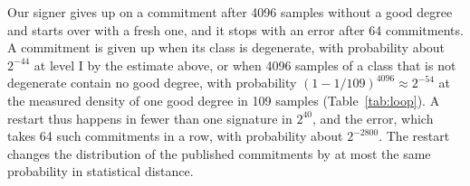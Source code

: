 \documentclass[version=preprint]{iacrcc}
\begin{document}
    Our signer gives up on a commitment after 4096 samples without a good
    degree and starts over with a fresh one, and it stops with an error after
    64 commitments. A commitment is given up when its class is degenerate,
    with probability about $2^{-44}$ at level I by the estimate above, or when
    4096 samples of a class that is not degenerate contain no good degree,
    with probability $(1 - 1/109)^{4096} \approx 2^{-54}$ at the measured
    density of one good degree in 109 samples (Table~\ref{tab:loop}). A
    restart thus happens in fewer than one signature in $2^{40}$, and the
    error, which takes 64 such commitments in a row, with probability about
    $2^{-2800}$. The restart changes the distribution of the
    published commitments by at most the same probability in statistical
    distance.
\end{document}
